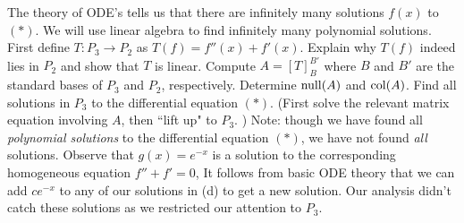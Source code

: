 The theory of ODE's tells us that there are infinitely many solutions $f(x)$ to $(*)$. We will use linear algebra to find infinitely many polynomial solutions. 
\bb
\ii First define $T\colon P_{3}\rightarrow P_{2}$ as $T(f)=f''(x)+f'(x)$. Explain why $T(f)$ indeed lies in $P_2$ and show that $T$ is linear. 
\ii Compute $A=[T]_{B}^{B'}$ where $B$ and  $B'$ are the standard bases of $P_{3}$ and $P_{2}$, respectively. 
\ii Determine $\operatorname{null}(A)$ and $\operatorname{col}(A)$. 
\ii Find all solutions in $P_3$ to the differential equation $(*)$. (First solve the relevant matrix equation involving $A$, then ``lift up" to $P_3$. )
\ee
{\footnotesize Note: though we have found all {\em polynomial solutions} to the differential equation $(*)$, we have not found {\em all} solutions. Observe that $g(x)=e^{-x}$ is a solution to the corresponding homogeneous equation $f''+f'=0$, It follows from basic ODE theory that we can add $ce^{-x}$ to any of our solutions in (d) to get a new solution. Our analysis didn't catch these solutions as we restricted our attention to $P_3$. }
\\
